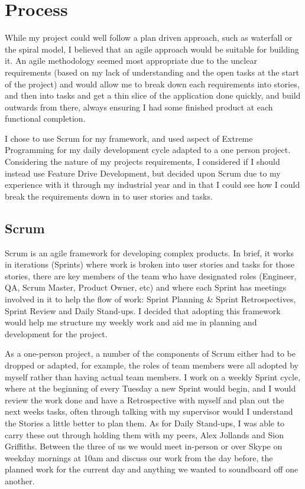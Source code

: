 
\section{Process}
While my project could well follow a plan driven approach, such as waterfall or the spiral model, I believed that an agile approach would be suitable for building it. An agile methodology seemed most appropriate due to the unclear requirements (based on my lack of understanding and the open tasks at the start of the project) and would allow me to break down each requirements into stories, and then into tasks and get a thin slice of the application done quickly, and build outwards from there, always ensuring I had some finished product at each functional completion.

I chose to use Scrum for my framework, and used aspect of Extreme Programming for my daily development cycle adapted to a one person project. Considering the  nature of my projects requirements, I considered if I should instead use Feature Drive Development, but decided upon Scrum due to my experience with it through my industrial year and in that I could see how I could break the requirements down in to user stories and tasks.

\subsection{Scrum}
Scrum is an agile framework for developing complex products\cite{Schw01a}. In brief, it works in iterations (Sprints) where work is broken into user stories and tasks for those stories, there are key members of the team who have designated roles (Engineer, QA, Scrum Master, Product Owner, etc) and where each Sprint has meetings involved in it to help the flow of work: Sprint Planning \& Sprint Retrospectives, Sprint Review and Daily Stand-ups. I decided that adopting this framework would help me structure my weekly work and aid me in planning and development for the project.

As a one-person project, a number of the components of Scrum either had to be dropped or adapted, for example, the roles of team members were all adopted by myself rather than having actual team members. I work on a weekly Sprint cycle, where at the beginning of every Tuesday a new Sprint would begin, and I would review the work done and have a Retrospective with myself and plan out the next weeks tasks, often through talking with my supervisor would I understand the Stories a little better to plan them. As for Daily Stand-ups, I was able to carry these out through holding them with my peers, Alex Jollands and Sion Griffiths. Between the three of us we would meet in-person or over Skype on weekday mornings at 10am and discuss our work from the day before, the planned work for the current day and anything we wanted to soundboard off one another.


